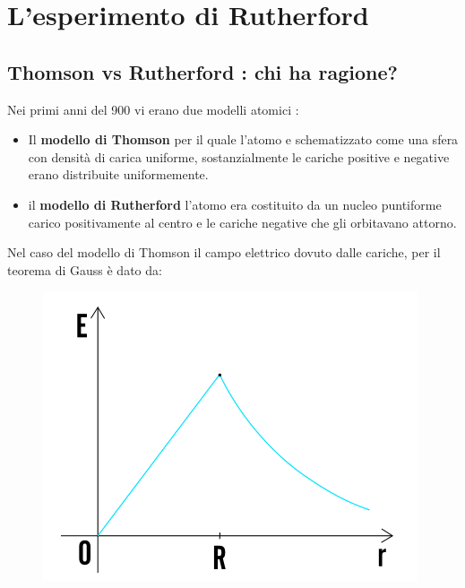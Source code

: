 \chapter{L'esperimento di Rutherford}
\section{Thomson vs Rutherford : chi ha ragione?}
Nei primi anni del 900 vi erano due modelli atomici : 
\begin{itemize}
        \item Il \textbf{modello di Thomson} per il quale l'atomo e schematizzato come una sfera
                con densità di carica uniforme, sostanzialmente le cariche positive e 
                negative erano distribuite uniformemente.
        \item il \textbf{modello di Rutherford} l'atomo era costituito da un nucleo puntiforme
                carico positivamente al centro e le cariche negative che gli orbitavano attorno.
\end{itemize}
Nel caso del modello di Thomson il campo elettrico dovuto dalle cariche, per il teorema di 
Gauss è dato da:
\begin{figure}[!h]
    \centering
    \includegraphics[scale=0.5]{ch5Ratherford/CampoE}
\end{figure}

